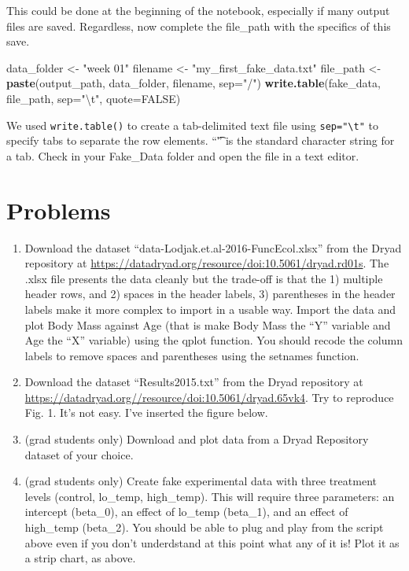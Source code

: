 \documentclass[]{book}
\newenvironment{Shaded}{\begin{snugshade}}{\end{snugshade}}
\newcommand{\KeywordTok}[1]{\textcolor[rgb]{0.13,0.29,0.53}{\textbf{#1}}}
\newcommand{\DataTypeTok}[1]{\textcolor[rgb]{0.13,0.29,0.53}{#1}}
\newcommand{\CharTok}[1]{\textcolor[rgb]{0.31,0.60,0.02}{#1}}
\newcommand{\StringTok}[1]{\textcolor[rgb]{0.31,0.60,0.02}{#1}}
\newcommand{\OtherTok}[1]{\textcolor[rgb]{0.56,0.35,0.01}{#1}}
\newcommand{\NormalTok}[1]{#1}
\begin{document}
This could be done at the beginning of the notebook, especially if many
output files are saved. Regardless, now complete the file\_path with the
specifics of this save.

\begin{Shaded}
\begin{Highlighting}[]
\NormalTok{data_folder <-}\StringTok{ "week 01"}
\NormalTok{filename <-}\StringTok{ "my_first_fake_data.txt"}
\NormalTok{file_path <-}\StringTok{ }\KeywordTok{paste}\NormalTok{(output_path, data_folder, filename, }\DataTypeTok{sep=}\StringTok{"/"}\NormalTok{)}
\KeywordTok{write.table}\NormalTok{(fake_data, file_path, }\DataTypeTok{sep=}\StringTok{"}\CharTok{\textbackslash{}t}\StringTok{"}\NormalTok{, }\DataTypeTok{quote=}\OtherTok{FALSE}\NormalTok{)}
\end{Highlighting}
\end{Shaded}

We used \texttt{write.table()} to create a tab-delimited text file using
\texttt{sep="\textbackslash{}t"} to specify tabs to separate the row
elements. ``\t'' is the standard character string for a tab. Check in
your Fake\_Data folder and open the file in a text editor.

\section{Problems}\label{problems}

\begin{enumerate}
\def\labelenumi{\arabic{enumi}.}
\item
  Download the dataset ``data-Lodjak.et.al-2016-FuncEcol.xlsx'' from the
  Dryad repository at
  \url{https://datadryad.org/resource/doi:10.5061/dryad.rd01s}. The
  .xlsx file presents the data cleanly but the trade-off is that the 1)
  multiple header rows, and 2) spaces in the header labels, 3)
  parentheses in the header labels make it more complex to import in a
  usable way. Import the data and plot Body Mass against Age (that is
  make Body Mass the ``Y'' variable and Age the ``X'' variable) using
  the qplot function. You should recode the column labels to remove
  spaces and parentheses using the setnames function.
\item
  Download the dataset ``Results2015.txt'' from the Dryad repository at
  \url{https://datadryad.org//resource/doi:10.5061/dryad.65vk4}. Try to
  reproduce Fig. 1. It's not easy. I've inserted the figure below.
\item
  (grad students only) Download and plot data from a Dryad Repository
  dataset of your choice.
\item
  (grad students only) Create fake experimental data with three
  treatment levels (control, lo\_temp, high\_temp). This will require
  three parameters: an intercept (beta\_0), an effect of lo\_temp
  (beta\_1), and an effect of high\_temp (beta\_2). You should be able
  to plug and play from the script above even if you don't underdstand
  at this point what any of it is! Plot it as a strip chart, as above.
\end{enumerate}
\end{document}

